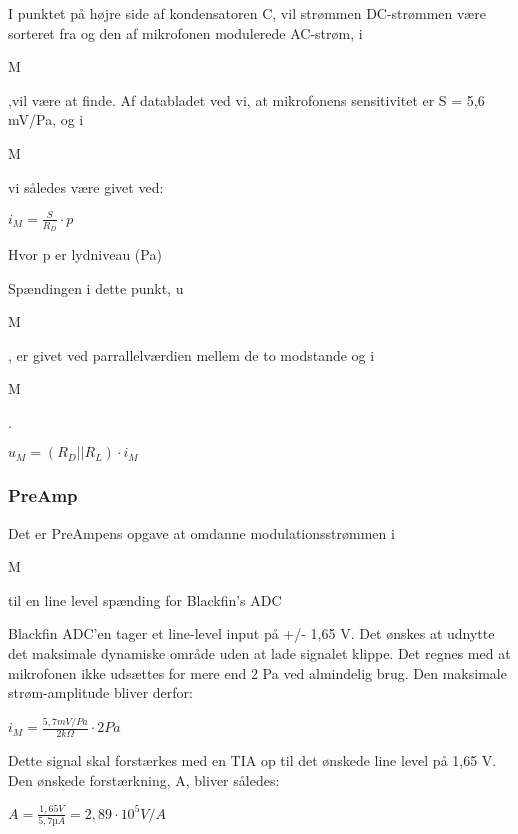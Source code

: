 I punktet på højre side af kondensatoren C, vil strømmen DC-strømmen være sorteret fra og den af mikrofonen modulerede AC-strøm, i\begin{tiny}M\end{tiny},vil være at finde. Af databladet ved vi, at mikrofonens sensitivitet er S = 5,6 mV/Pa, og i\begin{tiny}M\end{tiny} vi således være givet ved: 
\begin{center}
${ i }_{ M }=\frac { S }{ { R }_{ D } } \cdot p$
\end{center}
Hvor p er lydniveau (Pa)

Spændingen i dette punkt, u\begin{tiny}M\end{tiny}, er givet ved parrallelværdien mellem de to modstande og i\begin{tiny}M\end{tiny}. 
\begin{center}
${ u }_{ M }=({ R }_{ D }||{ R }_{ L })\cdot { i }_{ M } $
\end{center}

\subsubsection{PreAmp} 
Det er PreAmpens opgave at omdanne modulationsstrømmen i\begin{tiny}M\end{tiny} til en line level spænding for Blackfin's ADC 

Blackfin ADC'en tager et line-level input på +/- 1,65 V. 
Det ønskes at udnytte det maksimale dynamiske område uden at lade signalet klippe. Det regnes med at mikrofonen ikke udsættes for mere end 2 Pa ved almindelig brug. Den maksimale strøm-amplitude bliver derfor: 
\begin{center}
${ i }_{ M }=\frac { 5,7mV/Pa }{ 2k\Omega  } \cdot 2Pa $
\end{center}
Dette signal skal forstærkes med en TIA op til det ønskede line level på 1,65 V. Den ønskede forstærkning, A, bliver således:
\begin{center}
$A=\frac { 1,65V }{ 5,7µA } =2,89\cdot { 10 }^{ 5 }V/A$
\end{center}







